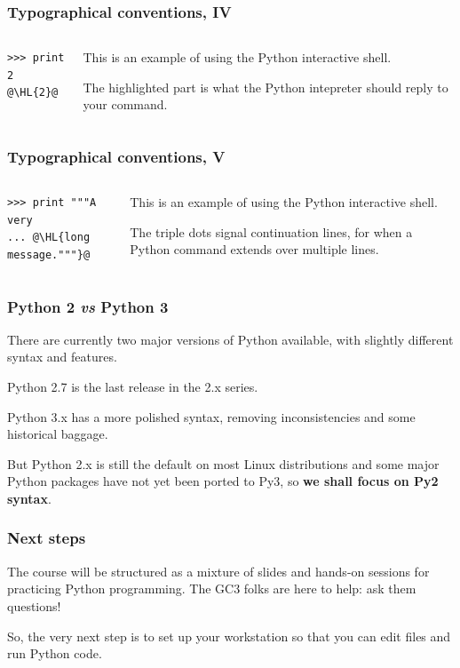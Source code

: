 \documentclass[english,serif,mathserif,xcolor=pdftex,dvipsnames,table]{beamer}
\begin{document}
\begin{frame}[fragile]
  \frametitle{Typographical conventions, IV}

    \begin{columns}[t]
    \begin{column}{0.5\textwidth}
\begin{lstlisting}
>>> print 2
@\HL{2}@
\end{lstlisting}
    \end{column}
    \begin{column}{0.5\textwidth}
      \raggedleft
      This is an example of using the Python interactive shell.

      \+
      The highlighted part is what the Python intepreter should
      reply to your command.
    \end{column}
  \end{columns}
\end{frame}


\begin{frame}[fragile]
  \frametitle{Typographical conventions, V}

    \begin{columns}[t]
    \begin{column}{0.5\textwidth}
\begin{lstlisting}
>>> print """A very
... @\HL{long message."""}@
\end{lstlisting}
    \end{column}
    \begin{column}{0.5\textwidth}
      \raggedleft
      This is an example of using the Python interactive shell.

      \+
      The triple dots signal continuation lines,
      for when a Python command extends over multiple lines.
    \end{column}
  \end{columns}
\end{frame}


\begin{frame}
  \frametitle{Python 2 \emph{vs} Python 3}

  There are currently two major versions of Python available, with
  slightly different syntax and features.

  \+
  Python 2.7 is the last release in the 2.x series.

  \+
  Python 3.x has a more polished syntax, removing inconsistencies and
  some historical baggage.

  \+
  But Python 2.x is still the default on most Linux distributions
  and some major Python packages have not yet been ported to Py3, so
  \textbf{we shall focus on Py2 syntax}.
\end{frame}


\begin{frame}
  \frametitle{Next steps}

  The course will be structured as a mixture of slides and hands-on
  sessions for practicing Python programming.  The GC3 folks are here
  to help: ask them questions!

  \+
  So, the very next step is to set up your workstation so that you
  can edit files and run Python code.
\end{frame}
\end{document}
